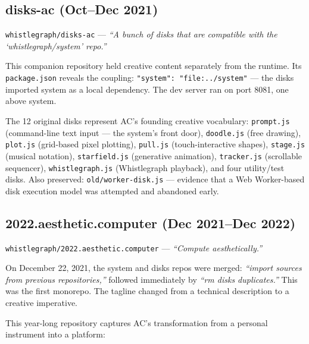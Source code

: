 \documentclass[10pt,letterpaper,twocolumn]{article}
\begin{document}
\subsection{disks-ac (Oct--Dec 2021)}

\texttt{whistlegraph/disks-ac} --- \emph{``A bunch of disks that are compatible with the `whistlegraph/system' repo.''}

This companion repository held creative content separately from the runtime. Its \texttt{package.json} reveals the coupling: \texttt{"system": "file:../system"} --- the disks imported system as a local dependency. The dev server ran on port 8081, one above system.

The 12 original disks represent AC's founding creative vocabulary: \texttt{prompt.js} (command-line text input --- the system's front door), \texttt{doodle.js} (free drawing), \texttt{plot.js} (grid-based pixel plotting), \texttt{pull.js} (touch-interactive shapes), \texttt{stage.js} (musical notation), \texttt{starfield.js} (generative animation), \texttt{tracker.js} (scrollable sequencer), \texttt{whistlegraph.js} (Whistlegraph playback), and four utility/test disks. Also preserved: \texttt{old/worker-disk.js} --- evidence that a Web Worker-based disk execution model was attempted and abandoned early.

\subsection{2022.aesthetic.computer (Dec 2021--Dec 2022)}

\texttt{whistlegraph/2022.aesthetic.computer} --- \emph{``Compute aesthetically.''}

On December 22, 2021, the system and disks repos were merged: \emph{``import sources from previous repositories,''} followed immediately by \emph{``rm disks duplicates.''} This was the first monorepo. The tagline changed from a technical description to a creative imperative.

This year-long repository captures AC's transformation from a personal instrument into a platform:
\end{document}
